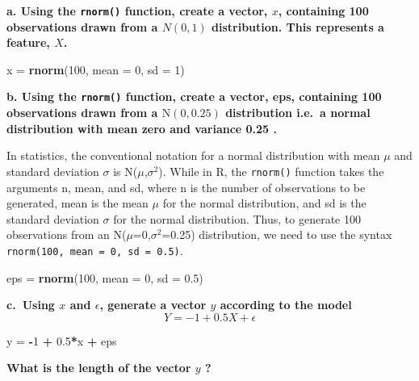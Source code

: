 \documentclass[
]{article}
\newenvironment{Shaded}{\begin{snugshade}}{\end{snugshade}}
\newcommand{\AttributeTok}[1]{\textcolor[rgb]{0.13,0.29,0.53}{#1}}
\newcommand{\DecValTok}[1]{\textcolor[rgb]{0.00,0.00,0.81}{#1}}
\newcommand{\FloatTok}[1]{\textcolor[rgb]{0.00,0.00,0.81}{#1}}
\newcommand{\FunctionTok}[1]{\textcolor[rgb]{0.13,0.29,0.53}{\textbf{#1}}}
\newcommand{\NormalTok}[1]{#1}
\newcommand{\OtherTok}[1]{\textcolor[rgb]{0.56,0.35,0.01}{#1}}
\newcommand{\SpecialCharTok}[1]{\textcolor[rgb]{0.81,0.36,0.00}{\textbf{#1}}}
\begin{document}
\textbf{a. Using the \texttt{rnorm()} function, create a vector, \(x\),
containing 100 observations drawn from a \(N(0,1)\) distribution. This
represents a feature, \(X\).}

\begin{Shaded}
\begin{Highlighting}[]
\NormalTok{x }\OtherTok{=} \FunctionTok{rnorm}\NormalTok{(}\DecValTok{100}\NormalTok{, }\AttributeTok{mean =} \DecValTok{0}\NormalTok{, }\AttributeTok{sd =} \DecValTok{1}\NormalTok{)}
\end{Highlighting}
\end{Shaded}

\textbf{b. Using the \texttt{rnorm()} function, create a vector, eps,
containing 100 observations drawn from a \(\mathrm{N}(0,0.25)\)
distribution i.e.~a normal distribution with mean zero and variance 0.25
.}

In statistics, the conventional notation for a normal distribution with
mean \(\mu\) and standard deviation \(\sigma\) is
N(\(\mu\),\(\sigma^2\)). While in R, the \texttt{rnorm()} function takes
the arguments n, mean, and sd, where n is the number of observations to
be generated, mean is the mean \(\mu\) for the normal distribution, and
sd is the standard deviation \(\sigma\) for the normal distribution.
Thus, to generate 100 observations from an
N(\(\mu\)=0,\(\sigma^2\)=0.25) distribution, we need to use the syntax
\texttt{rnorm(100,\ mean\ =\ 0,\ sd\ =\ 0.5)}.

\begin{Shaded}
\begin{Highlighting}[]
\NormalTok{eps }\OtherTok{=} \FunctionTok{rnorm}\NormalTok{(}\DecValTok{100}\NormalTok{, }\AttributeTok{mean =} \DecValTok{0}\NormalTok{, }\AttributeTok{sd =} \FloatTok{0.5}\NormalTok{)}
\end{Highlighting}
\end{Shaded}

\textbf{c.~Using \(x\) and \(\epsilon\), generate a vector \(y\)
according to the model} \[
Y=-1+0.5 X+\epsilon
\]

\begin{Shaded}
\begin{Highlighting}[]
\NormalTok{y }\OtherTok{=} \SpecialCharTok{{-}}\DecValTok{1} \SpecialCharTok{+} \FloatTok{0.5}\SpecialCharTok{*}\NormalTok{x }\SpecialCharTok{+}\NormalTok{ eps}
\end{Highlighting}
\end{Shaded}

\textbf{What is the length of the vector \(y\) ?}
\end{document}
